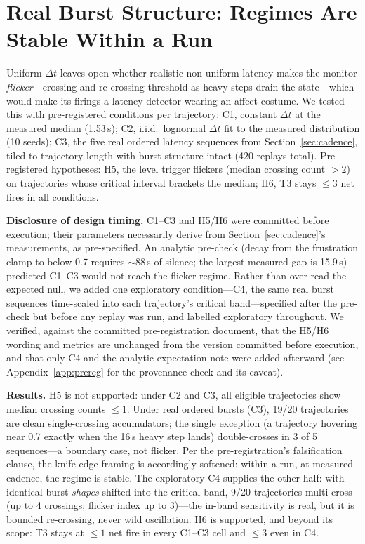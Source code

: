 \section{Real Burst Structure: Regimes Are Stable Within a Run}
\label{sec:burst}

Uniform $\Delta t$ leaves open whether realistic non-uniform latency makes the
monitor \emph{flicker}---crossing and re-crossing threshold as heavy steps drain
the state---which would make its firings a latency detector wearing an affect
costume. We tested this with pre-registered conditions per trajectory: C1,
constant $\Delta t$ at the measured median (1.53\,s); C2, i.i.d.\ lognormal
$\Delta t$ fit to the measured distribution (10 seeds); C3, the five real
ordered latency sequences from Section~\ref{sec:cadence}, tiled to trajectory
length with burst structure intact (420 replays total). Pre-registered
hypotheses: H5, the level trigger flickers (median crossing count $> 2$) on
trajectories whose critical interval brackets the median; H6, T3 stays $\le 3$
net fires in all conditions.

\textbf{Disclosure of design timing.} C1--C3 and H5/H6 were committed before
execution; their parameters necessarily derive from Section~\ref{sec:cadence}'s
measurements, as pre-specified. An analytic pre-check (decay from the
frustration clamp to below 0.7 requires ${\sim}88$\,s of silence; the largest
measured gap is 15.9\,s) predicted C1--C3 would not reach the flicker regime.
Rather than over-read the expected null, we added one exploratory
condition---C4, the same real burst sequences time-scaled into each trajectory's
critical band---specified after the pre-check but before any replay was run, and
labelled exploratory throughout. We verified, against the committed
pre-registration document, that the H5/H6 wording and metrics are unchanged from
the version committed before execution, and that only C4 and the
analytic-expectation note were added afterward (see Appendix~\ref{app:prereg}
for the provenance check and its caveat).

\textbf{Results.} H5 is not supported: under C2 and C3, all eligible
trajectories show median crossing counts $\le 1$. Under real ordered bursts
(C3), 19/20 trajectories are clean single-crossing accumulators; the single
exception (a trajectory hovering near 0.7 exactly when the 16\,s heavy step
lands) double-crosses in 3 of 5 sequences---a boundary case, not flicker. Per
the pre-registration's falsification clause, the knife-edge framing is
accordingly softened: within a run, at measured cadence, the regime is stable.
The exploratory C4 supplies the other half: with identical burst \emph{shapes}
shifted into the critical band, 9/20 trajectories multi-cross (up to 4
crossings; flicker index up to 3)---the in-band sensitivity is real, but it is
bounded re-crossing, never wild oscillation. H6 is supported, and beyond its
scope: T3 stays at $\le 1$ net fire in every C1--C3 cell and $\le 3$ even in C4.

